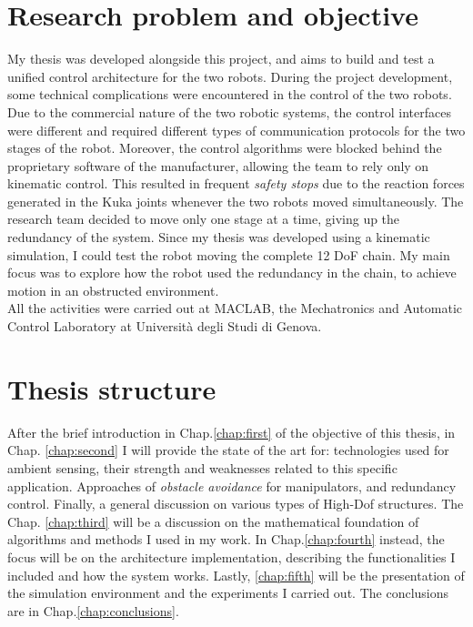 \section{Research problem and objective}
\noindent My thesis was developed alongside this project, and aims to build and test a unified control architecture for the two robots. During the project development, some technical complications were encountered in the control of the two robots.\\
\noindent Due to the commercial nature of the two robotic systems, the control interfaces were different and required different types of communication protocols for the two stages of the robot. Moreover, the control algorithms were blocked behind the proprietary software of the manufacturer, allowing the team to rely only on kinematic control. This resulted in frequent \textit{safety stops} due to the reaction forces generated in the Kuka joints whenever the two robots moved simultaneously. The research team decided to move only one stage at a time, giving up the redundancy of the system.
Since my thesis was developed using a kinematic simulation, I could test the robot moving the complete 12 DoF chain. My main focus was to explore how the robot used the redundancy in the chain, to achieve motion in an obstructed environment.\\
\noindent All the activities were carried out at MACLAB, the Mechatronics and Automatic Control Laboratory at Università degli Studi di Genova.

\section{Thesis structure}
After the brief introduction in Chap.\ref{chap:first} of the objective of this thesis, in Chap. \ref{chap:second} I will provide the state of the art for: technologies used for ambient sensing, their strength and weaknesses related to this specific application. 
\noindent Approaches of \textit{obstacle avoidance} for manipulators, and redundancy control. Finally, a general discussion on various types of High-Dof structures. 
The Chap. \ref{chap:third} will be a discussion on the mathematical foundation of algorithms and methods I used in my work.
In Chap.\ref{chap:fourth} instead, the focus will be on the architecture implementation, describing the functionalities I included and how the system works.
Lastly, \ref{chap:fifth} will be the presentation of the simulation environment and the experiments I carried out. The conclusions are in Chap.\ref{chap:conclusions}.
